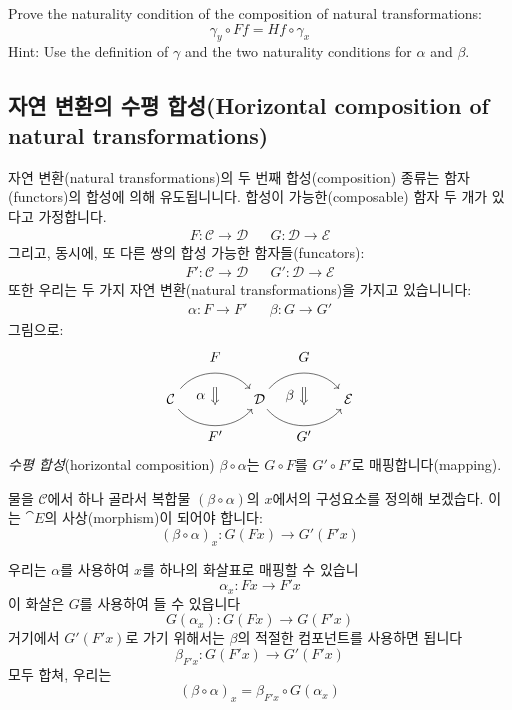 \documentclass[DaoFP]{subfiles}
\begin{document}
\begin{exercise}
Prove the naturality condition of the composition of natural transformations:
\[ \gamma_y \circ F f = H f \circ \gamma_x \]
Hint: Use the definition of $\gamma$ and the two naturality conditions for $\alpha$ and $\beta$.
\end{exercise}


\subsection{자연 변환의 수평 합성(Horizontal composition of natural transformations)}

자연 변환(natural transformations)의 두 번째 합성(composition) 종류는 함자(functors)의 합성에 의해 유도됩니니다. 합성이 가능한(composable) 함자 두 개가 있다고 가정합니다.
\begin{align*}
 F \colon \mathcal{C} \to \mathcal{D}
&&G \colon \mathcal{D} \to \mathcal{E} 
\end{align*}
그리고, 동시에, 또 다른 쌍의 합성 가능한 함자들(funcators):
\begin{align*}
 F' \colon \mathcal{C} \to \mathcal{D}
&& G' \colon \mathcal{D} \to \mathcal{E} 
\end{align*}
또한 우리는 두 가지 자연 변환(natural transformations)을 가지고 있습니니다:
\begin{align*}
\alpha \colon F \to F'  
&& \beta \colon G \to G' 
\end{align*}
그림으로:
\[
\begin{tikzcd}[column sep=huge]
\mathcal{C}
  \arrow[bend left=50]{r}[name=U, label=above:$F$]{}
  \arrow[bend right=50]{r}[name=D, label=below:$F'$]{} 
 &
\mathcal{D}
  \arrow[bend left=50]{r}[name=U1, label=above:$G$]{}
  \arrow[bend right=50]{r}[name=D1, label=below:$G'$]{} 
 &
\mathcal{E}
  \arrow[shorten <=10pt,shorten >=10pt,Rightarrow,to path={(U) -- node[label=left:$\alpha$] {} (D)}]{}
  \arrow[shorten <=10pt,shorten >=10pt,Rightarrow,to path={(U1) -- node[label=left:$\beta$] {} (D1)}]{}
\end{tikzcd}
\]
\emph{수평 합성}(horizontal composition) $\beta \circ \alpha$는 $G \circ F$를 $G' \circ F'$로 매핑합니다(mapping).

물을 $\mathcal{C}$에서 하나 골라서 복합물 $(\beta \circ \alpha)$의 $x$에서의 구성요소를 정의해 보겠습다. 이는 $\cat E$의 사상(morphism)이 되어야 합니다:
\[ (\beta \circ \alpha)_x \colon G ( F x) \to G' ( F' x) \]

우리는 $\alpha$를 사용하여 $x$를 하나의 화살표로 매핑할 수 있습니
\[ \alpha_x \colon F x \to F' x \]
이 화살은 $G$를 사용하여 들 수 있읍니다
\[ G (\alpha_x) \colon G (F x) \to G (F' x) \]
거기에서 $G' (F' x)$로 가기 위해서는 $\beta$의 적절한 컴포넌트를 사용하면 됩니다
\[ \beta_{F' x} \colon G (F' x) \to G' (F' x) \]
모두 합쳐, 우리는
\[ (\beta \circ \alpha)_x = \beta_{F' x} \circ G (\alpha_x) \]
\end{document}
